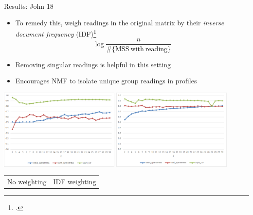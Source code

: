 \documentclass[10pt]{beamer}
\begin{document}
	\begin{frame}{Results: John 18}
		\begin{itemize}
			\item To remedy this, weigh readings in the original matrix by their \emph{inverse document frequency} (IDF)\footnote{\cite{Jones72}.}
			\begin{equation*}
				\log\frac{\mathit{n}}{\#\{\mathrm{MSS\ with\ reading}\}}
			\end{equation*}
			\item Removing singular readings is helpful in this setting
			\item Encourages NMF to isolate unique group readings in profiles
		\end{itemize}
		\begin{center}
			\includegraphics[width=0.45\textwidth]{../graphics/john_18_uniform_rank_est.png}
			\includegraphics[width=0.45\textwidth]{../graphics/john_18_idf_rank_est.png}
			\begin{tabular}{c @{\hskip 1.25in} c}
				No weighting & IDF weighting
			\end{tabular}
		\end{center}
	\end{frame}
\end{document}
